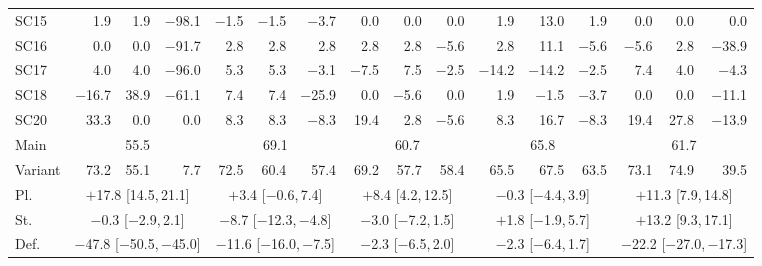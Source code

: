 \begin{tabular}{@{}l rrr rrr rrr rrr rrr@{}}
SC15 & 1.9 & 1.9 & $-$98.1 & $-$1.5 & $-$1.5 & $-$3.7 & 0.0 & 0.0 & 0.0 & 1.9 & 13.0 & 1.9 & 0.0 & 0.0 & 0.0 \\
SC16 & 0.0 & 0.0 & $-$91.7 & 2.8 & 2.8 & 2.8 & 2.8 & 2.8 & $-$5.6 & 2.8 & 11.1 & $-$5.6 & $-$5.6 & 2.8 & $-$38.9 \\
SC17 & 4.0 & 4.0 & $-$96.0 & 5.3 & 5.3 & $-$3.1 & $-$7.5 & 7.5 & $-$2.5 & $-$14.2 & $-$14.2 & $-$2.5 & 7.4 & 4.0 & $-$4.3 \\
SC18 & $-$16.7 & 38.9 & $-$61.1 & 7.4 & 7.4 & $-$25.9 & 0.0 & $-$5.6 & 0.0 & 1.9 & $-$1.5 & $-$3.7 & 0.0 & 0.0 & $-$11.1 \\
SC20 & 33.3 & 0.0 & 0.0 & 8.3 & 8.3 & $-$8.3 & 19.4 & 2.8 & $-$5.6 & 8.3 & 16.7 & $-$8.3 & 19.4 & 27.8 & $-$13.9 \\
\midrule
Main & \multicolumn{3}{c}{55.5} & \multicolumn{3}{c}{69.1} & \multicolumn{3}{c}{60.7} & \multicolumn{3}{c}{65.8} & \multicolumn{3}{c}{61.7} \\
Variant & 73.2 & 55.1 & 7.7 & 72.5 & 60.4 & 57.4 & 69.2 & 57.7 & 58.4 & 65.5 & 67.5 & 63.5 & 73.1 & 74.9 & 39.5 \\
\addlinespace
Pl. & \multicolumn{3}{c}{$+$17.8 {\tiny[14.5,\,21.1]}} & \multicolumn{3}{c}{$+$3.4 {\tiny[$-$0.6,\,7.4]}} & \multicolumn{3}{c}{$+$8.4 {\tiny[4.2,\,12.5]}} & \multicolumn{3}{c}{$-$0.3 {\tiny[$-$4.4,\,3.9]}} & \multicolumn{3}{c}{$+$11.3 {\tiny[7.9,\,14.8]}} \\
St. & \multicolumn{3}{c}{$-$0.3 {\tiny[$-$2.9,\,2.1]}} & \multicolumn{3}{c}{$-$8.7 {\tiny[$-$12.3,\,$-$4.8]}} & \multicolumn{3}{c}{$-$3.0 {\tiny[$-$7.2,\,1.5]}} & \multicolumn{3}{c}{$+$1.8 {\tiny[$-$1.9,\,5.7]}} & \multicolumn{3}{c}{$+$13.2 {\tiny[9.3,\,17.1]}} \\
Def. & \multicolumn{3}{c}{$-$47.8 {\tiny[$-$50.5,\,$-$45.0]}} & \multicolumn{3}{c}{$-$11.6 {\tiny[$-$16.0,\,$-$7.5]}} & \multicolumn{3}{c}{$-$2.3 {\tiny[$-$6.5,\,2.0]}} & \multicolumn{3}{c}{$-$2.3 {\tiny[$-$6.4,\,1.7]}} & \multicolumn{3}{c}{$-$22.2 {\tiny[$-$27.0,\,$-$17.3]}} \\
\bottomrule
\end{tabular}
